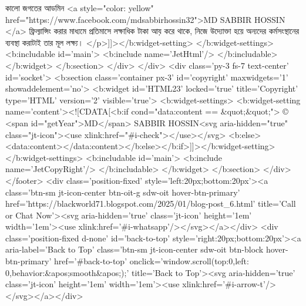 {{{{কালো জগতের আডমিন <a style="color: yellow" href="https://www.facebook.com/mdsabbirhossin32">MD SABBIR HOSSIN </a> ফ্রিল্যান্সিং করার মাধ্যমে প্রতিমাসে লক্ষাধিক টাকা আয় করে থাকে, নিজে উদ্যোক্তা হয়ে অন্যদের কর্মসংস্থানের ব্যবস্থা করাটাই তার মূল লক্ষ্য।
</p>]]></b:widget-setting>
        </b:widget-settings>
        <b:includable id='main'>
      <b:include name='JetHtml'/>
    </b:includable>
      </b:widget>
    </b:section>
  </div>
</div>
<div class='py-3 fs-7 text-center' id='socket'>
<b:section class='container px-3' id='copyright' maxwidgets='1' showaddelement='no'>
  <b:widget id='HTML23' locked='true' title='Copyright' type='HTML' version='2' visible='true'>
    <b:widget-settings>
      <b:widget-setting name='content'><![CDATA[<b:if cond="data:content == &quot;&quot;">
                            © <span id="getYear">MD</span> SABBIR HOSSIN<svg aria-hidden="true" class="jt-icon"><use xlink:href="#i-check"></use></svg> <b:else><data:content></data:content></b:else></b:if>]]></b:widget-setting>
    </b:widget-settings>
    <b:includable id='main'>
      <b:include name='JetCopyRight'/>
    </b:includable>
  </b:widget>
</b:section>
</div>
</footer>
<div class='position-fixed' style='left:20px;bottom:20px'><a class='btn-sm jt-icon-center btn-oit-g sdw-oit hover-btn-primary' href='https://blackworld71.blogspot.com/2025/01/blog-post_6.html' title='Call or Chat Now'><svg aria-hidden='true' class='jt-icon' height='1em' width='1em'><use xlink:href='#i-whatsapp'/></svg></a></div>
<div class='position-fixed d-none' id='back-to-top' style='right:20px;bottom:20px'><a aria-label='Back to Top' class='btn-sm jt-icon-center sdw-oit btn-block hover-btn-primary' href='#back-to-top' onclick='window.scroll({top:0,left: 0,behavior:&apos;smooth&apos;});' title='Back to Top'><svg aria-hidden='true' class='jt-icon' height='1em' width='1em'><use xlink:href='#i-arrow-t'/></svg></a></div>

}}}}
